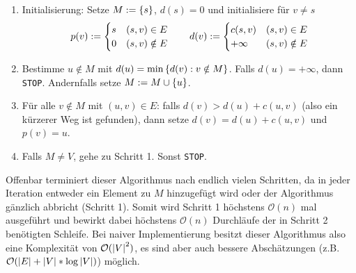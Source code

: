 \begin{enumerate}[label=Schritt \arabic*:, leftmargin=*, start=0]
	\item Initialisierung: Setze $M \mathrel{:=} \left\{ s \right\}$, $d(s) = 0$ und initialisiere für $v \neq s$
	\begin{equation*}
		p(v) \mathrel{:=} \begin{cases}
		s & (s,v) \in E \\ 0 & (s,v) \notin E
		\end{cases} 
		\qquad
		d(v) \mathrel{:=} \begin{cases}
		c(s,v) & (s,v) \in E \\ +\infty &(s,v) \notin E
		\end{cases}
	\end{equation*}
	\item Bestimme $u \notin M$ mit $d(u) = \min\left\{ d(v) : v \notin M \right\}$. Falls $d(u) = +\infty$, dann \texttt{STOP}. Andernfalls setze $M \mathrel{:=} M \cup \left\{ u \right\}$.
	\item Für alle $v \notin M$ mit $(u,v) \in E$: falls $d(v) > d(u) + c(u,v)$ (also ein kürzerer Weg ist gefunden), dann setze $d(v) = d(u) + c(u,v)$ und $p(v) = u$.
	\item Falls $M \neq V$, gehe zu Schritt 1. Sonst \texttt{STOP}.
\end{enumerate}

Offenbar terminiert dieser Algorithmus nach endlich vielen Schritten, da in jeder Iteration entweder ein Element zu $M$ hinzugefügt wird oder der Algorithmus gänzlich abbricht (Schritt 1). Somit wird Schritt 1 höchstens $\mathcal{O}(n)$ mal ausgeführt und bewirkt dabei höchstens $\mathcal{O}(n)$ Durchläufe der in Schritt 2 benötigten Schleife. Bei naiver Implementierung besitzt dieser Algorithmus also eine Komplexität von $\mathcal{O}(\left| V \right|^2)$, es sind aber auch bessere Abschätzungen (z.B. $\mathcal{O}(\left| E \right| + \left| V \right| * \log\left| V \right|)$) möglich.